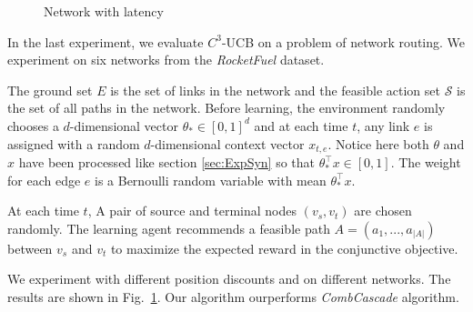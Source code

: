 \documentclass{article}
\newcommand{\cS}{\mathcal{S}}
\begin{document}
\begin{figure}
	\centering
	\caption{Network with latency}
	\label{fig:network} %
\end{figure}

In the last experiment, we evaluate $C^3$-UCB on a problem of network routing. We experiment on six networks from the {\it RocketFuel} dataset\cite{spring2004measuring}.

The ground set $E$ is the set of links in the network and the feasible action set $\cS$ is the set of all paths in the network. Before learning, the environment randomly chooses a $d$-dimensional vector $\theta_* \in [0,1]^d$ and at each time $t$, any link $e$ is assigned with a random $d$-dimensional context vector $x_{t,e}$. Notice here both $\theta$ and $x$ have been processed like section \ref{sec:ExpSyn} so that $\theta_*^{\top}x \in [0,1]$. The weight for each edge $e$ is a Bernoulli random variable with mean $\theta_*^{\top}x$.

At each time $t$, A pair of source and terminal nodes $(v_s, v_t)$ are chosen randomly. The learning agent recommends a feasible path $A = (a_1,...,a_{|A|})$ between $v_s$ and $v_t$ to maximize the expected reward in the conjunctive objective.

We experiment with different position discounts and on different networks. The results are shown in Fig.~\ref{fig:network}. Our algorithm ourperforms {\it CombCascade} algorithm.
\end{document}
